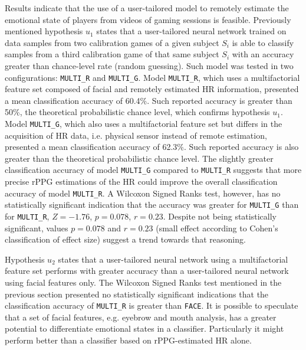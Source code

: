 

Results indicate that the use of a user-tailored model to remotely estimate the emotional state of players from videos of gaming sessions is feasible. Previously mentioned hypothesis $u_1$ states that a user-tailored neural network trained on data samples from two calibration games of a given subject $S_i$ is able to classify samples from a third calibration game of that same subject $S_i$ with an accuracy greater than chance-level rate (random guessing). Such model was tested in two configurations: \texttt{MULTI\_R} and \texttt{MULTI\_G}. Model \texttt{MULTI\_R}, which uses a multifactorial feature set composed of facial and remotely estimated HR information, presented a mean classification accuracy of 60.4\%. Such reported accuracy is greater than 50\%, the theoretical probabilistic chance level, which confirms hypothesis $u_1$. Model \texttt{MULTI\_G}, which also uses a multifactorial feature set but differs in the acquisition of HR data, i.e. physical sensor instead of remote estimation, presented a mean classification accuracy of 62.3\%. Such reported accuracy is also greater than the theoretical probabilistic chance level. The slightly greater classification accuracy of model \texttt{MULTI\_G} compared to \texttt{MULTI\_R} suggests that more precise rPPG estimations of the HR could improve the overall classification accuracy of model \texttt{MULTI\_R}. A Wilcoxon Signed Ranks test, however, has no statistically significant indication that the accuracy was greater for \texttt{MULTI\_G} than for \texttt{MULTI\_R}, $Z=-1.76$, $p=0.078$, $r=0.23$. Despite not being statistically significant, values $p=0.078$ and $r=0.23$ (small effect according to Cohen's classification of effect size) suggest a trend towards that reasoning.

Hypothesis $u_2$ states that a user-tailored neural network using a multifactorial feature set performs with greater accuracy than a user-tailored neural network using facial features only. The Wilcoxon Signed Ranks test mentioned in the previous section presented no statistically significant indications that the classification accuracy of \texttt{MULTI\_R} is greater than \texttt{FACE}. It is possible to speculate that a set of facial features, e.g. eyebrow and mouth analysis, has a greater potential to differentiate emotional states in a classifier. Particularly it might perform better than a classifier based on rPPG-estimated HR alone.

